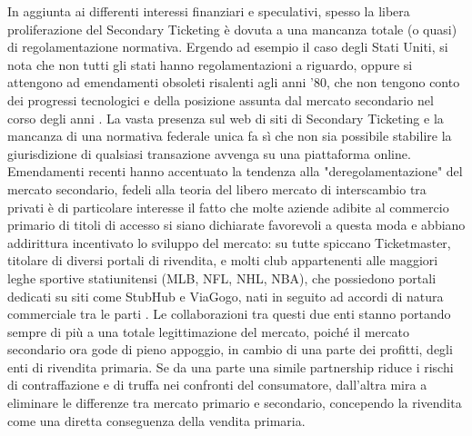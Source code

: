 In aggiunta ai differenti interessi finanziari e speculativi, spesso la libera proliferazione del Secondary Ticketing è dovuta a una mancanza totale (o quasi) di regolamentazione normativa. Ergendo ad esempio il caso degli Stati Uniti, si nota che non tutti gli stati hanno regolamentazioni a riguardo, oppure si attengono ad emendamenti obsoleti risalenti agli anni '80, che non tengono conto dei progressi tecnologici e della posizione assunta dal mercato secondario nel corso degli anni \cite{courty2017ticket, drayer2011examining}.
La vasta presenza sul web di siti di Secondary Ticketing e la mancanza di una normativa federale unica fa sì che non sia possibile stabilire la giurisdizione di qualsiasi transazione avvenga su una piattaforma online.  
Emendamenti recenti hanno accentuato la tendenza alla "deregolamentazione" del mercato secondario, fedeli alla teoria del libero mercato di interscambio tra privati è di particolare interesse il fatto che molte aziende adibite al commercio primario di titoli di accesso si siano dichiarate favorevoli a questa moda e abbiano addirittura incentivato lo sviluppo del mercato: su tutte spiccano Ticketmaster, titolare di diversi portali di rivendita, e molti club appartenenti alle maggiori leghe sportive statiunitensi (MLB, NFL, NHL, NBA), che possiedono portali dedicati su siti come StubHub e ViaGogo, nati in seguito ad accordi di natura commerciale tra le parti \cite{courty2014pricing}.
Le collaborazioni tra questi due enti stanno portando sempre di più a una totale legittimazione del mercato, poiché il mercato secondario ora gode di pieno appoggio, in cambio di una parte dei profitti, degli enti di rivendita primaria. Se da una parte una simile partnership riduce i rischi di contraffazione e di truffa nei confronti del consumatore, dall'altra mira a eliminare le differenze tra mercato primario e secondario, concependo la rivendita come una diretta conseguenza della vendita primaria. 


